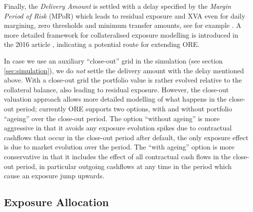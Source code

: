 \documentclass[12pt, a4paper]{article}
\begin{document}
{{\begin{appendix}
\medskip Finally, the {\em Delivery Amount } is settled with a delay specified by the {\em Margin Period of Risk}
(MPoR) which leads to residual exposure and XVA even for daily margining, zero thresholds and minimum transfer amounts,
see for example \cite{Pykhtin2010}. A more detailed framework for collateralised exposure modelling is introduced in the
2016 article \cite{Andersen2016}, indicating a potential route for extending ORE.

\medskip
In case we use an auxiliary ``close-out'' grid in the simulation (see section \ref{sec:simulation}), we do {\em not} settle the delivery amount with the delay mentioned above. With a close-out grid the portfolio value is rather evolved relative to the collateral balance, also leading to residual exposure. However, the close-out valuation approach allows more detailed modelling of what happens in the close-out period; currently ORE supports two options, with and without portfolio ``ageing'' over the close-out period. The option ``without ageing'' is more aggressive in that it avoids any exposure evolution spikes due to contractual cashflows that occur in the close-out period after default, the only exposure effect is due to market evolution over the period. The ``with ageing'' option is more conservative in that it includes the effect of all contractual cash flows in the close-out period, in particular outgoing cashflows at any time in the period which cause an exposure jump upwards. 

\subsection{Exposure Allocation}\label{sec:app_allocation}


\end{appendix}}}
\end{document}
